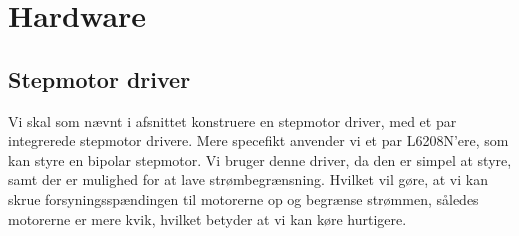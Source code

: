 \chapter[Implementering af hardware]{Hardware}


\section{Stepmotor driver}
Vi skal som nævnt i afsnittet  konstruere en
stepmotor driver, med et par integrerede stepmotor drivere. Mere
specefikt anvender vi et par L6208N'ere, som kan styre en bipolar
stepmotor. Vi bruger denne driver, da den er simpel at styre, samt der
er mulighed for at lave strømbegrænsning. Hvilket vil gøre, at vi kan
skrue forsyningsspændingen til motorerne op og begrænse strømmen,
således motorerne er mere kvik, hvilket betyder at vi kan køre
hurtigere.



